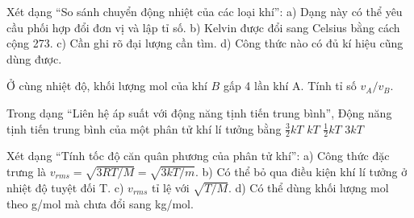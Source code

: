 \begin{ex}
Xét dạng “So sánh chuyển động nhiệt của các loại khí”: a) Dạng này có thể yêu cầu phối hợp đổi đơn vị và lập tỉ số. b) Kelvin được đổi sang Celsius bằng cách cộng 273. c) Cần ghi rõ đại lượng cần tìm. d) Công thức nào có đủ kí hiệu cũng dùng được.
\choiceTF

\end{ex}

\begin{ex}
Ở cùng nhiệt độ, khối lượng mol của khí $B$ gấp 4 lần khí A. Tính tỉ số $v_A/v_B$.
\end{ex}

\begin{ex}
Trong dạng “Liên hệ áp suất với động năng tịnh tiến trung bình”, Động năng tịnh tiến trung bình của một phân tử khí lí tưởng bằng
\choice
{\True $\frac32kT$}
{$kT$}
{$\frac12kT$}
{$3kT$}
\end{ex}

\begin{ex}
Xét dạng “Tính tốc độ căn quân phương của phân tử khí”: a) Công thức đặc trưng là $v_{rms}=\sqrt{3RT/M}=\sqrt{3kT/m}$. b) Có thể bỏ qua điều kiện khí lí tưởng ở nhiệt độ tuyệt đối T. c) $v_{rms}$ tỉ lệ với $\sqrt{T/M}$. d) Có thể dùng khối lượng mol theo g/mol mà chưa đổi sang kg/mol.
\choiceTF

\end{ex}


